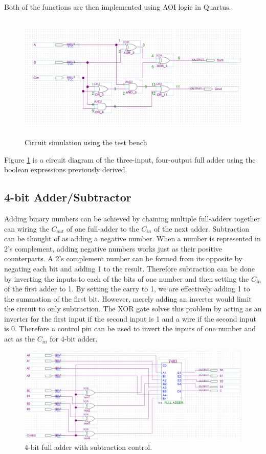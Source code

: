 \documentclass[CMPE]{KGCOEReport}
\begin{document}
Both of the functions are then implemented using AOI logic in Quartus.

\begin{figure}[h!]
	\centering
	\includegraphics[height=6cm]{circuit}
	\caption{Circuit simulation using the test bench}
	\label{fig:fulladder}
\end{figure}

Figure \ref{fig:fulladder} is a circuit diagram of the three-input, four-output full adder using the boolean expressions previously derived.

\subsection*{4-bit Adder/Subtractor}

Adding binary numbers can be achieved by chaining multiple full-adders together can wiring the $C_{out}$ of one full-adder to the $C_{in}$ of the next adder. Subtraction can be thought of as adding a negative number. When a number is represented in 2's complement, adding negative numbers works just as their positive counterparts. A 2's complement number can be formed from its opposite by negating each bit and adding 1 to the result. Therefore subtraction can be done by inverting the inputs to each of the bits of one number and then setting the $C_{in}$ of the first adder to 1. By setting the carry to 1, we are effectively adding 1 to the summation of the first bit. However, merely adding an inverter would limit the circuit to only subtraction. The XOR gate solves this problem by acting as an inverter for the first input if the second input is 1 and a wire if the second input is 0. Therefore a control pin can be used to invert the inputs of one number and act as the $C_{in}$ for 4-bit adder.

\begin{figure}[h!]
	\centering
	\includegraphics[width=\textwidth]{4-bit_full}
	\caption{4-bit full adder with subtraction control.}
	\label{fig:4bitadder}
\end{figure}
\end{document}

